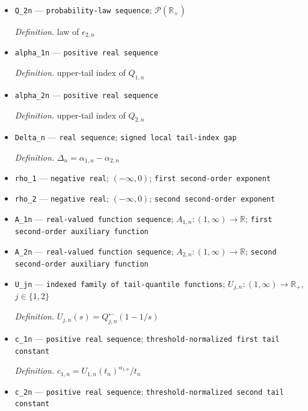 \documentclass{article}
\begin{document}
\begin{itemize}
  \par\smallskip\noindent\emph{Definition.} law of \(\epsilon_{1,n}\)
  \item \texttt{Q\_\allowbreak{}2n} --- \texttt{probability-\allowbreak{}law sequence}; \(\mathcal P(\mathbb R_+)\)
  \par\smallskip\noindent\emph{Definition.} law of \(\epsilon_{2,n}\)
  \item \texttt{alpha\_\allowbreak{}1n} --- \texttt{positive real sequence}
  \par\smallskip\noindent\emph{Definition.} upper-tail index of \(Q_{1,n}\)
  \item \texttt{alpha\_\allowbreak{}2n} --- \texttt{positive real sequence}
  \par\smallskip\noindent\emph{Definition.} upper-tail index of \(Q_{2,n}\)
  \item \texttt{Delta\_\allowbreak{}n} --- \texttt{real sequence}; \texttt{signed local tail-\allowbreak{}index gap}
  \par\smallskip\noindent\emph{Definition.} \(\Delta_n=\alpha_{1,n}-\alpha_{2,n}\)
  \item \texttt{rho\_\allowbreak{}1} --- \texttt{negative real}; \(( -\infty,0)\); \texttt{first second-\allowbreak{}order exponent}
  \item \texttt{rho\_\allowbreak{}2} --- \texttt{negative real}; \(( -\infty,0)\); \texttt{second second-\allowbreak{}order exponent}
  \item \texttt{A\_\allowbreak{}1n} --- \texttt{real-\allowbreak{}valued function sequence}; \(A_{1,n}:(1,\infty)\to\mathbb R\); \texttt{first second-\allowbreak{}order auxiliary function}
  \item \texttt{A\_\allowbreak{}2n} --- \texttt{real-\allowbreak{}valued function sequence}; \(A_{2,n}:(1,\infty)\to\mathbb R\); \texttt{second second-\allowbreak{}order auxiliary function}
  \item \texttt{U\_\allowbreak{}jn} --- \texttt{indexed family of tail-\allowbreak{}quantile functions}; \(U_{j,n}:(1,\infty)\to\mathbb R_+\), \(j\in\{1,2\}\)
  \par\smallskip\noindent\emph{Definition.} \(U_{j,n}(s)=Q_{j,n}^{\leftarrow}(1-1/s)\)
  \item \texttt{c\_\allowbreak{}1n} --- \texttt{positive real sequence}; \texttt{threshold-\allowbreak{}normalized first tail constant}
  \par\smallskip\noindent\emph{Definition.} \(c_{1,n}=U_{1,n}(t_n)^{\alpha_{1,n}}/t_n\)
  \item \texttt{c\_\allowbreak{}2n} --- \texttt{positive real sequence}; \texttt{threshold-\allowbreak{}normalized second tail constant}

\end{itemize}
\end{document}

